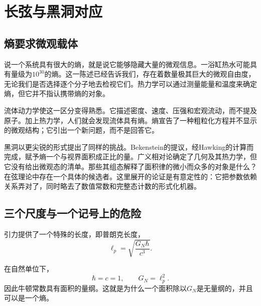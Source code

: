 \chapter{长弦与黑洞对应}


\section{熵要求微观载体}

说一个系统具有很大的熵，就是说它能够隐藏大量的微观信息。一浴缸热水可能具有量级为\(10^{30}\)的熵。这一陈述已经告诉我们，存在着数量极其巨大的微观自由度，无论我们是否选择逐个分子地去检视它们。热力学可以通过测量能量和温度来确定熵，但它并不指认携带熵的对象。

流体动力学使这一区分变得熟悉。它描述密度、速度、压强和宏观流动，而不提及原子。加上热力学，人们就会发现流体具有熵。熵宣告了一种粗粒化方程并不显示的微观结构；它引出一个新问题，而不是回答它。

黑洞以更尖锐的形式提出了同样的挑战。Bekenstein的提议，经Hawking的计算而完成，赋予熵一个与视界面积成正比的量。广义相对论确定了几何及其热力学，但它没有给出微观态的清单。那些其组态解释了面积律的微小而众多的对象是什么？在弦理论中存在一个具体的候选者。这里展开的论证是有意定性的：它把参数依赖关系弄对了，同时略去了数值常数和完整态计数的形式化机器。

\section{三个尺度与一个记号上的危险}

引力提供了一个特殊的长度，即普朗克长度，
\begin{equation}
\ell_p=\sqrt{\frac{G_N\hbar}{c^3}}.
\label{eq:l06-planck-si}
\end{equation}

\begin{classroomqa}
\end{classroomqa}

在自然单位下，
\begin{equation}
\hbar=c=1,
\qquad
G_N=\ell_p^2.
\label{eq:l06-planck-area}
\end{equation}
因此牛顿常数具有面积的量纲。这就是为什么一个面积除以\(G_N\)是无量纲的，并且可以是一个熵。

